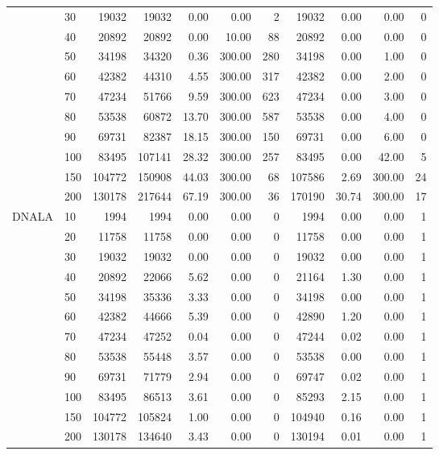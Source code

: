 \documentclass[12pt]{article}
\begin{document}
\begin{table}
{\begin{tabular}{llr|rrrr|rrrr}
   & 30  &    19032 &    19032 &   0.00 &   0.00 &          2 &    19032 &  0.00 &   0.00 &          0 \\
   & 40  &    20892 &    20892 &   0.00 &  10.00 &         88 &    20892 &  0.00 &   0.00 &          0 \\
   & 50  &    34198 &    34320 &   0.36 & 300.00 &        280 &    34198 &  0.00 &   1.00 &          0 \\
   & 60  &    42382 &    44310 &   4.55 & 300.00 &        317 &    42382 &  0.00 &   2.00 &          0 \\
   & 70  &    47234 &    51766 &   9.59 & 300.00 &        623 &    47234 &  0.00 &   3.00 &          0 \\
   & 80  &    53538 &    60872 &  13.70 & 300.00 &        587 &    53538 &  0.00 &   4.00 &          0 \\
   & 90  &    69731 &    82387 &  18.15 & 300.00 &        150 &    69731 &  0.00 &   6.00 &          0 \\
   & 100 &    83495 &   107141 &  28.32 & 300.00 &        257 &    83495 &  0.00 &  42.00 &          5 \\
   & 150 &   104772 &   150908 &  44.03 & 300.00 &         68 &   107586 &  2.69 & 300.00 &         24 \\
   & 200 &   130178 &   217644 &  67.19 & 300.00 &         36 &   170190 & 30.74 & 300.00 &         17 \\
   \midrule
DNALA & 10  &     1994 &     1994 &   0.00 &   0.00 &          0 &     1994 &  0.00 &   0.00 &          1 \\
   & 20  &    11758 &    11758 &   0.00 &   0.00 &          0 &    11758 &  0.00 &   0.00 &          1 \\
   & 30  &    19032 &    19032 &   0.00 &   0.00 &          0 &    19032 &  0.00 &   0.00 &          1 \\
   & 40  &    20892 &    22066 &   5.62 &   0.00 &          0 &    21164 &  1.30 &   0.00 &          1 \\
   & 50  &    34198 &    35336 &   3.33 &   0.00 &          0 &    34198 &  0.00 &   0.00 &          1 \\
   & 60  &    42382 &    44666 &   5.39 &   0.00 &          0 &    42890 &  1.20 &   0.00 &          1 \\
   & 70  &    47234 &    47252 &   0.04 &   0.00 &          0 &    47244 &  0.02 &   0.00 &          1 \\
   & 80  &    53538 &    55448 &   3.57 &   0.00 &          0 &    53538 &  0.00 &   0.00 &          1 \\
   & 90  &    69731 &    71779 &   2.94 &   0.00 &          0 &    69747 &  0.02 &   0.00 &          1 \\
   & 100 &    83495 &    86513 &   3.61 &   0.00 &          0 &    85293 &  2.15 &   0.00 &          1 \\
   & 150 &   104772 &   105824 &   1.00 &   0.00 &          0 &   104940 &  0.16 &   0.00 &          1 \\
   & 200 &   130178 &   134640 &   3.43 &   0.00 &          0 &   130194 &  0.01 &   0.00 &          1 \\


\end{tabular}}
\end{table}
\end{document}

